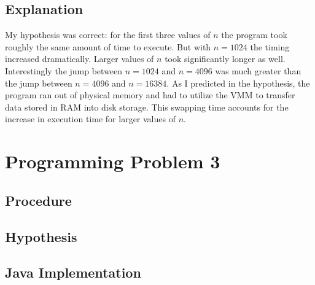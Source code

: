 \documentclass[11pt]{article}
\begin{document}
\subsection*{Explanation}

My hypothesis was correct: for the first three values of $n$ the program took roughly the same amount of time to execute. But with $n=1024$ the timing increased dramatically. Larger values of $n$ took significantly longer as well. Interestingly the jump between $n=1024$ and $n=4096$ was much greater than the jump between $n=4096$ and $n=16384$. As I predicted in the hypothesis, the program ran out of physical memory and had to utilize the VMM to transfer data stored in RAM into disk storage. This swapping time accounts for the increase in execution time for larger values of $n$.

\section*{Programming Problem 3}

\subsection*{Procedure}

\subsection*{Hypothesis}

\subsection*{Java Implementation}
\end{document}
